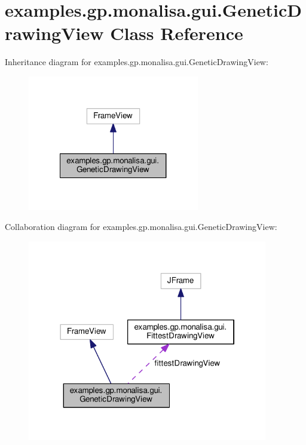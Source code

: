 \hypertarget{classexamples_1_1gp_1_1monalisa_1_1gui_1_1_genetic_drawing_view}{\section{examples.\-gp.\-monalisa.\-gui.\-Genetic\-Drawing\-View Class Reference}
\label{classexamples_1_1gp_1_1monalisa_1_1gui_1_1_genetic_drawing_view}
}


Inheritance diagram for examples.\-gp.\-monalisa.\-gui.\-Genetic\-Drawing\-View\-:
\nopagebreak
\begin{figure}[H]
\begin{center}
\leavevmode
\includegraphics[width=212pt]{classexamples_1_1gp_1_1monalisa_1_1gui_1_1_genetic_drawing_view__inherit__graph}
\end{center}
\end{figure}


Collaboration diagram for examples.\-gp.\-monalisa.\-gui.\-Genetic\-Drawing\-View\-:
\nopagebreak
\begin{figure}[H]
\begin{center}
\leavevmode
\includegraphics[width=297pt]{classexamples_1_1gp_1_1monalisa_1_1gui_1_1_genetic_drawing_view__coll__graph}
\end{center}
\end{figure}
